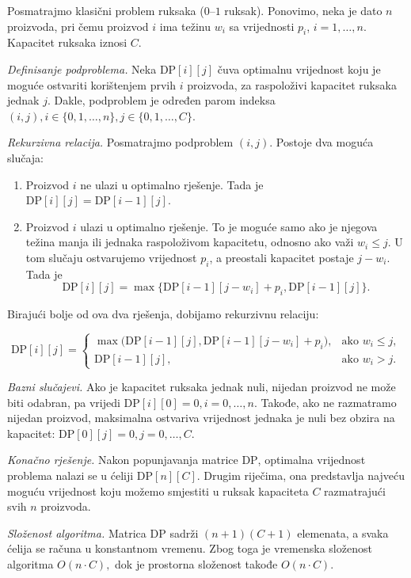 \begin{solution}
	
	Posmatrajmo klasični problem ruksaka ($0$--$1$ ruksak). Ponovimo, neka je dato $n$ proizvoda, pri čemu proizvod $i$ ima težinu $w_i$ sa vrijednosti $p_i$,  $i=1,\ldots,n$. Kapacitet ruksaka iznosi $C$.
	
	\medskip
	
	\textit{Definisanje podproblema.} Neka $\textrm{DP}[i][j]$ čuva optimalnu vrijednost koju je moguće ostvariti korištenjem prvih $i$ proizvoda, za raspoloživi kapacitet ruksaka jednak $j$.  Dakle, podproblem je određen parom indeksa $
	(i,j), 
	i \in \{0,1,\ldots,n\}, 
	j \in \{0,1,\ldots,C\}.$
	
	\medskip
	
	\textit{Rekurzivna relacija.} Posmatrajmo podproblem $(i,j)$.	Postoje dva moguća slučaja:
	
	\begin{enumerate}
		\item Proizvod $i$ ne ulazi u optimalno rješenje. Tada je
	    $  \textrm{DP}[i][j] = \textrm{DP}[i-1][j].$
		\item Proizvod $i$ ulazi u optimalno rješenje. To je moguće samo ako je njegova težina manja ili jednaka raspoloživom kapacitetu, odnosno ako važi $w_i \leq j$. U tom slučaju ostvarujemo vrijednost $p_i$, a preostali kapacitet postaje $j-w_i$. Tada je
		$$
		\textrm{DP}[i][j] =\max\{ \textrm{DP}[i-1][j-w_i] + p_i, \textrm{DP}[i-1][j] \}.
		$$
		
	\end{enumerate}
	
	Birajući bolje od ova dva rješenja, dobijamo rekurzivnu relaciju:
	
	$$
	\textrm{DP}[i][j] =
	\begin{cases}
		\max\bigl(\textrm{DP}[i-1][j],\textrm{DP}[i-1][j-w_i] + p_i\bigr),
		& \text{ako } w_i \leq j, \\
		\textrm{DP}[i-1][j],
		& \text{ako } w_i > j.
	\end{cases}
	$$
	\medskip
	
	\textit{Bazni slučajevi.} Ako je kapacitet ruksaka jednak nuli, nijedan proizvod ne može biti odabran, pa vrijedi $
	\textrm{DP}[i][0]=0, i=0,\ldots,n.$  Takođe, ako ne razmatramo nijedan proizvod, maksimalna ostvariva vrijednost jednaka je nuli bez obzira na kapacitet: $\textrm{DP}[0][j]=0, j=0,\ldots,C.$
	
	\medskip
	
	\textit{Konačno rješenje.}	Nakon popunjavanja matrice $\textrm{DP}$, optimalna vrijednost problema nalazi se u ćeliji $
	\textrm{DP}[n][C].$	Drugim riječima, ona predstavlja najveću moguću vrijednost koju možemo smjestiti u ruksak kapaciteta $C$ razmatrajući svih $n$ proizvoda.
	
	\medskip
	
	\textit{Složenost algoritma.}  Matrica $\textrm{DP}$ sadrži $(n+1)(C+1)$ elemenata, a svaka ćelija se računa u konstantnom vremenu. Zbog toga je vremenska složenost algoritma $ O(n \cdot C),$ dok je prostorna složenost takođe $O(n \cdot C).$
	
\end{solution}
  \\
	 

